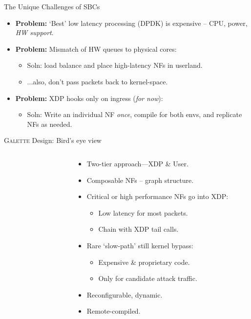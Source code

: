 \documentclass[aspectratio=169,xcolor={dvipsnames}
]{beamer}
\newcommand{\ourtech}{\textsc{Galette}}
\begin{document}
\begin{frame}{The Unique Challenges of SBCs}
	\begin{itemize}
		\item \textbf{Problem:} `Best' low latency processing (DPDK) is \alert{expensive} -- CPU, power, \emph{HW support}.
		\item \textbf{Problem:} Mismatch of HW queues to physical cores:
		\begin{itemize}[<+->]
			\item \alert{Soln:} load balance and place high-latency NFs in userland.
			\item ...also, don't pass packets back to kernel-space.
		\end{itemize}
		\item \textbf{Problem:} XDP hooks only on ingress (\emph{for now}):
		\begin{itemize}[<+->]
			\item \alert{Soln:} Write an individual NF \emph{once}, compile for both envs, and replicate NFs as needed.
		\end{itemize}
	\end{itemize}
\end{frame}

\begin{frame}{\ourtech{} Design: Bird's eye view}
	\begin{columns}
		\begin{column}{0.5\linewidth}
			\begin{figure}
				\centering
				\resizebox{0.9\linewidth}{!}{\hspace{-0.9cm}\hspace{-0.2cm}}
			\end{figure}
		\end{column}
		\begin{column}{0.5\linewidth}
			\begin{itemize}
				\item Two-tier approach---XDP \& User.
				\item Composable NFs -- graph structure.
				\item Critical or high performance NFs go into XDP:
				\begin{itemize}
					\item \alert{Low latency for most packets}.
					\item Chain with XDP tail calls.
				\end{itemize}
				\item Rare `slow-path' still kernel bypass:
				\begin{itemize}
					\item Expensive \& proprietary code.
					\item Only for candidate attack traffic.
				\end{itemize}
				\item Reconfigurable, dynamic.
				\item \alert{Remote-compiled.}
			\end{itemize}
		\end{column}
	\end{columns}
\end{frame}
\end{document}
